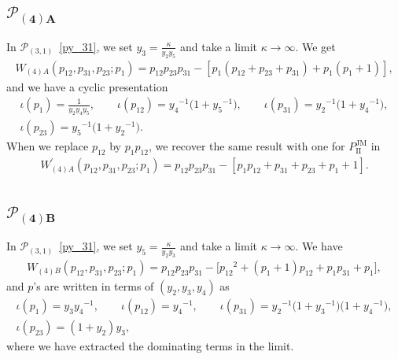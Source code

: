 \documentclass[pdftex]{sigma}
\numberwithin{equation}{section}
\begin{document}
\subsection[$\mathcal{P}_{(4)A}$]{$\boldsymbol{\mathcal{P}_{(4)A}}$}
In $\mathcal{P}_{(3,1)}$~\eqref{py_31}, we set $ y_3 = \frac{\kappa}{y_2 y_5}$ and take a limit $\kappa \to \infty$. We get
\begin{gather} \label{W_4A}
 W_{(4)A}(p_{12}, p_{31}, p_{23}; p_1) = p_{12} p_{23} p_{31} - [ p_1 ( p_{12} + p_{23} + p_{31} ) + p_1 ( p_1 + 1 ) ],
\end{gather}
and we have a cyclic presentation
\begin{gather}
 \iota(p_1) = \frac{1}{y_2 y_4 y_5},\qquad \iota(p_{12}) ={y_4}^{-1} \big( 1+{y_5}^{-1} \big) , \qquad \iota( p_{31}) = {y_2}^{-1} \big( 1 +{y_4}^{-1} \big) , \nonumber\\
 \iota(p_{23}) = {y_5}^{-1} \big( 1 + {y_2}^{-1} \big) . \label{py_4A}
\end{gather}
When we replace $p_{12}$ by $ p_1 p_{12}$, we recover the same result with one for $P_{\mathrm{II}}^{\text{JM}}$ in~\cite{vdPutSaito09a}
\begin{gather*}%
 {W}^\prime_{(4)A}( p_{12}, p_{31}, p_{23} ; p_1 ) = p_{12} p_{23} p_{31} - [ p_1 p_{12}+p_{31} + p_{23}+ p_1 +1 ] .
\end{gather*}

\subsection[$\mathcal{P}_{(4)B}$]{$\boldsymbol{\mathcal{P}_{(4)B}}$}
In $\mathcal{P}_{(3,1)}$~\eqref{py_31}, we set $ y_5 = \frac{\kappa}{y_2 y_3}$ and take a limit $\kappa\to \infty$. We have
\begin{gather} \label{W_4B}
 W_{(4)B}(p_{12}, p_{31}, p_{23}; p_1) = p_{12} p_{23} p_{31} - \big[ {p_{12}}^2 + ( p_1+1 ) p_{12} + p_1 p_{31} +p_1 \big],
\end{gather}
and $p$'s are written in terms of $(y_2, y_3, y_4)$ as
\begin{gather*}
 \iota(p_1) = y_3 {y_4}^{-1},\qquad \iota(p_{12}) = {y_4}^{-1} , \qquad \iota(p_{31}) = {y_2}^{-1} \big(1+{y_3}^{-1}\big) \big(1+{y_4}^{-1}\big) , \\
 \iota(p_{23}) = ( 1+ y_2 ) y_3 ,
\end{gather*}
where we have extracted the dominating terms in the limit.
\end{document}
